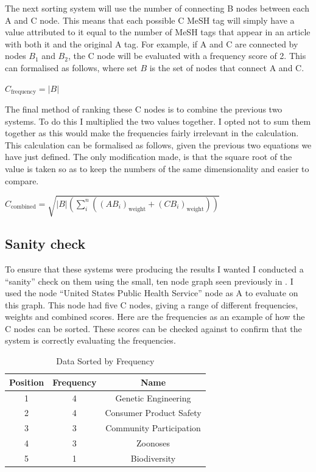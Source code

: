 \documentclass{l4proj}
\begin{document}
The next sorting system will use the number of connecting B nodes between each A and C node. This means that each possible C MeSH tag will simply have a value attributed to it equal to the number of MeSH tags that appear in an article with both it and the original A tag. For example, if A and C are connected by nodes $B_1$ and $B_2$, the C node will be evaluated with a frequency score of 2. This can formalised as follows, where set $B$ is the set of nodes that connect A and C.
\begin{center}
    $C_{\text{frequency}} = |B| $\\
\end{center}

The final method of ranking these C nodes is to combine the previous two systems. To do this I multiplied the two values together. I opted not to sum them together as this would make the frequencies fairly irrelevant in the calculation. This calculation can be formalised as follows, given the previous two equations we have just defined. The only modification made, is that the square root of the value is taken so as to keep the numbers of the same dimensionality and easier to compare.

\begin{center}
    $C_{\text{combined}} = \sqrt{|B|(\sum_i^n ((AB_i)_{\text{weight}} + (CB_i)_{\text{weight}}))}$\\
\end{center}

\subsection{Sanity check}

To ensure that these systems were producing the results I wanted I conducted a ``sanity'' check on them using the small, ten node graph seen previously in . I used the node ``United States Public Health Service'' node as A to evaluate on this graph. This node had five C nodes, giving a range of different frequencies, weights and combined scores. Here are the frequencies as an example of how the C nodes can be sorted. These scores can be checked against  to confirm that the system is correctly evaluating the frequencies.\\

\begin{table}[h]
\centering
\caption{Data Sorted by Frequency}
\begin{tabular}{|c|c|c|}
\hline
\textbf{Position} & \textbf{Frequency} & \textbf{Name} \\ \hline
1 & 4 & Genetic Engineering \\ \hline
2 & 4 & Consumer Product Safety \\ \hline
3 & 3 & Community Participation \\ \hline
4 & 3 & Zoonoses \\ \hline
5 & 1 & Biodiversity \\ \hline
\end{tabular}
\end{table}
\end{document}
